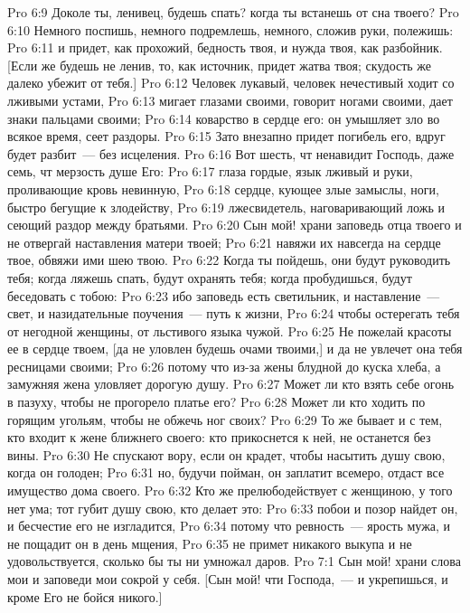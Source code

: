 \vs Pro 6:9 Доколе ты, ленивец, будешь спать? когда ты встанешь от сна твоего?
\vs Pro 6:10 Немного поспишь, немного подремлешь, немного, сложив руки, полежишь:
\vs Pro 6:11 и придет, как прохожий, бедность твоя, и нужда твоя, как разбойник. [Если же будешь не ленив, то, как источник, придет жатва твоя; скудость же далеко убежит от тебя.]
\rsbpar\vs Pro 6:12 Человек лукавый, человек нечестивый ходит со лживыми устами,
\vs Pro 6:13 мигает глазами своими, говорит ногами своими, дает знаки пальцами своими;
\vs Pro 6:14 коварство в сердце его: он умышляет зло во всякое время, сеет раздоры.
\vs Pro 6:15 Зато внезапно придет погибель его, вдруг будет разбит~--- без исцеления.
\vs Pro 6:16 Вот шесть, чт ненавидит Господь, даже семь, чт мерзость душе Его:
\vs Pro 6:17 глаза гордые, язык лживый и руки, проливающие кровь невинную,
\vs Pro 6:18 сердце, кующее злые замыслы, ноги, быстро бегущие к злодейству,
\vs Pro 6:19 лжесвидетель, наговаривающий ложь и сеющий раздор между братьями.
\rsbpar\vs Pro 6:20 Сын мой! храни заповедь отца твоего и не отвергай наставления матери твоей;
\vs Pro 6:21 навяжи их навсегда на сердце твое, обвяжи ими шею твою.
\vs Pro 6:22 Когда ты пойдешь, они будут руководить тебя; когда ляжешь спать, будут охранять тебя; когда пробудишься, будут беседовать с тобою:
\vs Pro 6:23 ибо заповедь есть светильник, и наставление~--- свет, и назидательные поучения~--- путь к жизни,
\vs Pro 6:24 чтобы остерегать тебя от негодной женщины, от льстивого языка чужой.
\vs Pro 6:25 Не пожелай красоты ее в сердце твоем, [да не уловлен будешь очами твоими,] и да не увлечет она тебя ресницами своими;
\vs Pro 6:26 потому что из-за жены блудной  до куска хлеба, а замужняя жена уловляет дорогую душу.
\vs Pro 6:27 Может ли кто взять себе огонь в пазуху, чтобы не прогорело платье его?
\vs Pro 6:28 Может ли кто ходить по горящим угольям, чтобы не обжечь ног своих?
\vs Pro 6:29 То же бывает и с тем, кто входит к жене ближнего своего: кто прикоснется к ней, не останется без вины.
\vs Pro 6:30 Не спускают вору, если он крадет, чтобы насытить душу свою, когда он голоден;
\vs Pro 6:31 но, будучи пойман, он заплатит всемеро, отдаст все имущество дома своего.
\vs Pro 6:32 Кто же прелюбодействует с женщиною, у того нет ума; тот губит душу свою, кто делает это:
\vs Pro 6:33 побои и позор найдет он, и бесчестие его не изгладится,
\vs Pro 6:34 потому что ревность~--- ярость мужа, и не пощадит он в день мщения,
\vs Pro 6:35 не примет никакого выкупа и не удовольствуется, сколько бы ты ни умножал даров.
\vs Pro 7:1 Сын мой! храни слова мои и заповеди мои сокрой у себя. [Сын мой! чти Господа,~--- и укрепишься, и кроме Его не бойся никого.]
